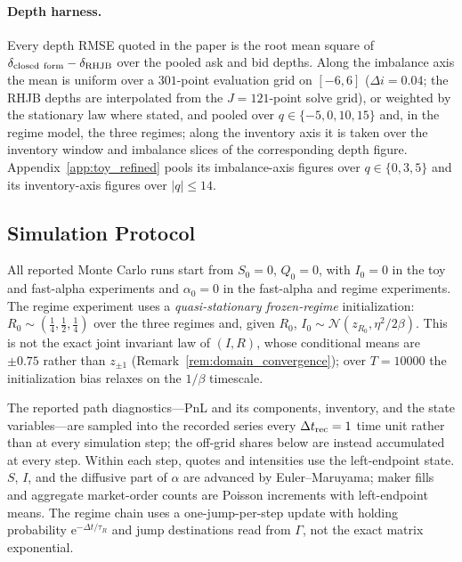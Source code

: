 \documentclass[11pt,a4paper]{article}
\newcommand{\e}{\mathrm e}
\theoremstyle{plain}
\theoremstyle{definition}
\begin{document}
\paragraph{Depth harness.}
Every depth RMSE quoted in the paper is the root mean square of
\(\delta_{\rm closed\ form}-\delta_{\rm RHJB}\) over the pooled ask and bid
depths.  Along the imbalance axis the mean is uniform over a \(301\)-point
evaluation grid on \([-6,6]\) (\(\Delta i=0.04\); the RHJB depths are
interpolated from the \(J=121\)-point solve grid), or weighted by the
stationary law where stated, and pooled over
\(q\in\{-5,0,10,15\}\) and, in the regime model, the three regimes; along the
inventory axis it is taken over the inventory window and imbalance slices of
the corresponding depth figure.  Appendix~\ref{app:toy_refined} pools its
imbalance-axis figures over \(q\in\{0,3,5\}\) and its inventory-axis figures
over \(|q|\le14\).

\subsection{Simulation Protocol}

All reported Monte Carlo runs start from \(S_0=0\), \(Q_0=0\), with
\(I_0=0\) in the toy and fast-alpha experiments and \(\alpha_0=0\) in the
fast-alpha and regime experiments.  The regime experiment uses a
\emph{quasi-stationary frozen-regime} initialization:
\(R_0\sim(\tfrac14,\tfrac12,\tfrac14)\) over the three regimes and, given
\(R_0\), \(I_0\sim\mathcal N(z_{R_0},\eta^2/2\beta)\).  This is not the exact
joint invariant law of \((I,R)\), whose conditional means are \(\pm0.75\)
rather than \(z_{\pm1}\) (Remark~\ref{rem:domain_convergence}); over
\(T=10000\) the initialization bias relaxes on the \(1/\beta\) timescale.

The reported path diagnostics---PnL and its components, inventory, and the
state variables---are sampled into the recorded series every
\(\Delta t_{\rm rec}=1\) time unit rather than at every simulation step; the
off-grid shares below are instead accumulated at every step.  Within each
step, quotes and intensities use the left-endpoint state.  \(S\),
\(I\), and the diffusive part of \(\alpha\) are advanced by Euler--Maruyama;
maker fills and aggregate market-order counts are Poisson increments with
left-endpoint means.  The regime chain uses a one-jump-per-step update with
holding probability \(\e^{-\Delta t/\tau_R}\) and jump destinations read from
\(\Gamma\), not the exact matrix exponential.
\end{document}
